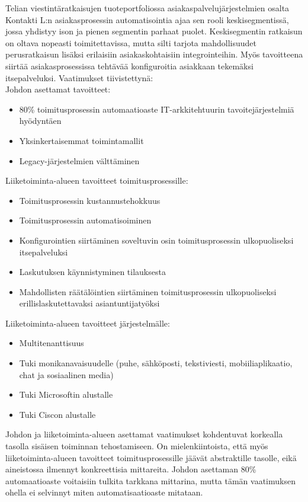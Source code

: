 \documentclass[finnish,12pt,a4paper,pdftex]{article}
\begin{document}
Telian viestintäratkaisujen tuoteportfoliossa asiakaspalvelujärjestelmien osalta Kontakti L:n asiakasprosessin automatisointia ajaa sen rooli keskisegmentissä, jossa yhdistyy ison ja pienen segmentin parhaat puolet. Keskisegmentin ratkaisun on oltava nopeasti toimitettavissa, mutta silti tarjota mahdollisuudet perusratkaisun lisäksi erilaisiin asiakaskohtaisiin integrointeihin. Myös tavoitteena siirtää asiakasprosessissa tehtävää konfiguroitia asiakkaan tekemäksi itsepalveluksi. Vaatimukset tiivistettynä:\\

Johdon asettamat tavoitteet:
\begin{itemize}
    \item 80\% toimitusprosessin automaatioaste IT-arkkitehtuurin tavoitejärjestelmiä hyödyntäen
    \item Yksinkertaisemmat toimintamallit
    \item Legacy-järjestelmien välttäminen
\end{itemize}
Liiketoiminta-alueen tavoitteet toimitusprosessille:
\begin{itemize}
    \item Toimitusprosessin kustannustehokkuus
    \item Toimitusprosessin automatisoiminen
    \item Konfigurointien siirtäminen soveltuvin osin toimitusprosessin ulkopuoliseksi itsepalveluksi
    \item Laskutuksen käynnistyminen tilauksesta
    \item Mahdollisten räätälöintien siirtäminen toimitusprosessin ulkopuoliseksi erillislaskutettavaksi asiantuntijatyöksi
\end{itemize}
Liiketoiminta-alueen tavoitteet järjestelmälle:
\begin{itemize}
    \item Multitenanttisuus
    \item Tuki monikanavaisuudelle (puhe, sähköposti, tekstiviesti, mobiiliaplikaatio, chat ja sosiaalinen media)
    \item Tuki Microsoftin alustalle
    \item Tuki Ciscon alustalle
\end{itemize}

Johdon ja liiketoiminta-alueen asettamat vaatimukset kohdentuvat korkealla tasolla sisäisen toiminnan tehostamiseen. On mielenkiintoista, että myös liiketoiminta-alueen tavoitteet toimitusprosessille jäävät abstraktille tasolle, eikä aineistossa ilmennyt konkreettisia mittareita. Johdon asettaman 80\% automaatioaste voitaisiin tulkita tarkkana mittarina, mutta tämän vaatimuksen ohella ei selvinnyt miten automatisaatioaste mitataan.\\
\end{document}
